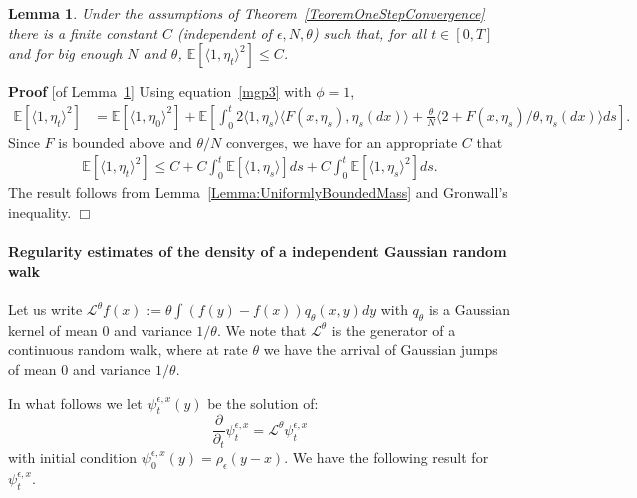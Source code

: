 \documentclass[12pt]{article}
\newenvironment {proof}{{\noindent\bf Proof }}{\hfill $\Box$ \medskip}
\newtheorem{lemma}[theorem]{Lemma}
\newcommand{\IE}{\mathbb E}
\begin{document}
\begin{lemma}
        \label{lem:SecondMomentMass}
    Under the assumptions of Theorem~\ref{TeoremOneStepConvergence}
    there is a finite constant $C$ (independent of $\epsilon, N, \theta$) such that,
    for all $t \in [0,T]$ and for big enough $N$ and $\theta$,
    $\IE[ \langle 1, \eta_t \rangle^2] \leq C$.
\end{lemma} 

\begin{proof}[of Lemma~\ref{lem:SecondMomentMass}]
    Using equation~\eqref{mgp3} with $\phi = 1$,
    \begin{align*}
        \IE[\langle 1, \eta_t \rangle^2]
        &=
        \IE[\langle 1, \eta_0 \rangle^2]
        +
        \IE\left[
        \int_0^t
            2 \langle 1, \eta_s \rangle
            \langle F(x, \eta_s), \eta_s(dx) \rangle
            +
            \frac{\theta}{N} \langle 2 + F(x, \eta_s)/\theta, \eta_s(dx) \rangle
        ds
        \right] .
    \end{align*}
    Since $F$ is bounded above and $\theta/N$ converges,
    we have for an appropriate $C$ that
    \begin{align*}
        \IE[\langle 1, \eta_t \rangle^2]
        \le
        C + C \int_0^t \IE[\langle 1, \eta_s \rangle] ds
        + C \int_0^t \IE[\langle 1, \eta_s \rangle^2] ds .
    \end{align*}
    The result follows from Lemma~\ref{Lemma:UniformlyBoundedMass} and Gronwall's inequality.
\end{proof}


\paragraph{Regularity estimates of the density of a independent Gaussian random walk}
Let us write $\mathcal{L}^\theta f(x) := \theta \int (f(y)-f(x))q_\theta(x,y) dy$ with $q_\theta$ is a Gaussian kernel of mean $0$ and variance $1/\theta$. We note that $\mathcal{L}^\theta$ is the generator of a continuous random walk, where at rate $\theta$ we have the arrival of Gaussian jumps of mean $0$ and variance $1/\theta$.

In what follows we let $\psi_t^{\epsilon, x}(y)$ be the solution of:
\begin{equation}
    \frac{\partial}{ \partial_t} \psi_t^{\epsilon,x}
    =
    \mathcal{L}^\theta \psi_t^{\epsilon, x}
    \label{AlmostHeatEquation}
\end{equation}
with initial condition $\psi_0^{\epsilon,x}(y) = \rho_\epsilon(y-x)$.
We have the following result for $\psi_t^{\epsilon,x}$.
\end{document}
